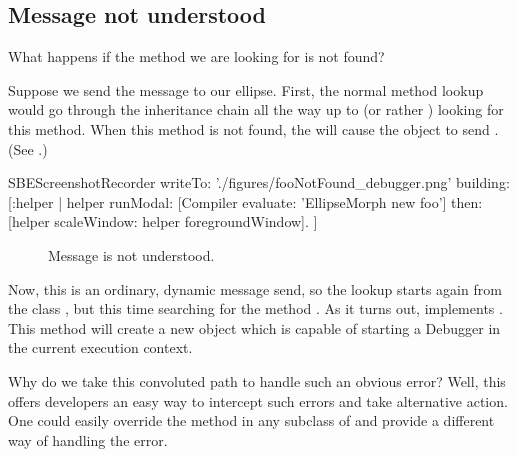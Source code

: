 \documentclass[a4paper,10pt,twoside]{book}
\begin{document}
\subsection{Message not understood}

What happens if the method we are looking for is not found?

Suppose we send the message  to our ellipse.
First, the normal method lookup would go through the inheritance chain all the way up to  (or rather ) looking for this method.
When this method is not found, the  will cause the object to send .
(See .)

\begin{ExecuteSmalltalkScript}
SBEScreenshotRecorder writeTo: './figures/fooNotFound_debugger.png' building: [:helper |
	helper
		runModal: [Compiler evaluate: 'EllipseMorph new foo']
		then: [helper scaleWindow: helper foregroundWindow].
]
\end{ExecuteSmalltalkScript}
\begin{figure}[htb]
\begin{center}
\begin{scaletikzpicturetowidth}{\textwidth} %
\end{scaletikzpicturetowidth}
\caption{Message  is not understood\label{fig:fooNotFound}.}
\end{center}
\end{figure}

Now, this is an ordinary, dynamic message send, so the lookup starts again from the class , but this time searching for the method .
As it turns out,  implements .
This method will create a new  object which is capable of starting a Debugger in the current execution context.

Why do we take this convoluted path to handle such an obvious error?
Well, this offers developers an easy way to intercept such errors and take alternative action.
One could easily override the method  in any subclass of  and  provide a different way of handling the error.
\end{document}
